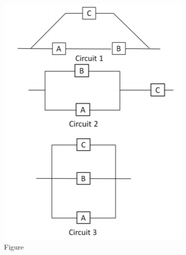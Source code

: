 \begin{enumerate}[label=\thesection.\arabic*.,ref=\thesection.\theenumi]
\begin{figure}[h]
    \includegraphics[width=\columnwidth]{solutions/2016/june/118/Figures/circuits.png}
    \caption{Figure}
    \label{fig:fig_label}
\end{figure}
%
\solution



\end{enumerate}